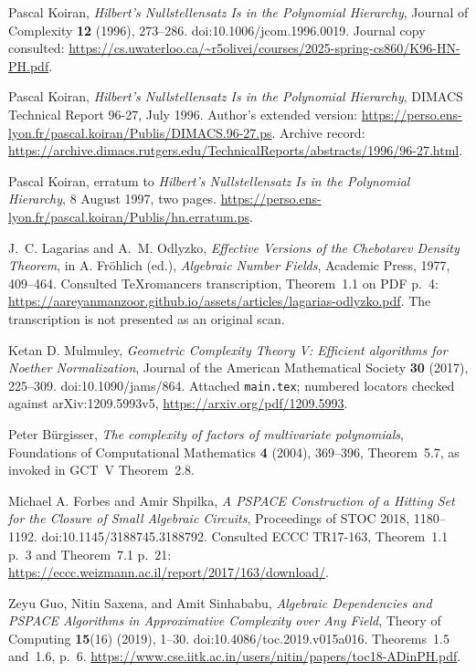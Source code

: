 Pascal Koiran, \emph{Hilbert's Nullstellensatz Is in the Polynomial
Hierarchy}, Journal of Complexity \textbf{12} (1996), 273--286.
doi:10.1006/jcom.1996.0019.
Journal copy consulted:
\url{https://cs.uwaterloo.ca/~r5olivei/courses/2025-spring-cs860/K96-HN-PH.pdf}.

Pascal Koiran, \emph{Hilbert's Nullstellensatz Is in the Polynomial
Hierarchy}, DIMACS Technical Report 96-27, July 1996.
Author's extended version:
\url{https://perso.ens-lyon.fr/pascal.koiran/Publis/DIMACS.96-27.ps}.
Archive record:
\url{https://archive.dimacs.rutgers.edu/TechnicalReports/abstracts/1996/96-27.html}.

Pascal Koiran, erratum to \emph{Hilbert's Nullstellensatz Is in the
Polynomial Hierarchy}, 8 August 1997, two pages.
\url{https://perso.ens-lyon.fr/pascal.koiran/Publis/hn.erratum.ps}.

J.~C. Lagarias and A.~M. Odlyzko, \emph{Effective Versions of the
Chebotarev Density Theorem}, in A. Fr\"ohlich (ed.), \emph{Algebraic
Number Fields}, Academic Press, 1977, 409--464.
Consulted TeXromancers transcription, Theorem~1.1 on PDF p.~4:
\url{https://aareyanmanzoor.github.io/assets/articles/lagarias-odlyzko.pdf}.
The transcription is not presented as an original scan.

Ketan D. Mulmuley, \emph{Geometric Complexity Theory V: Efficient
algorithms for Noether Normalization}, Journal of the American
Mathematical Society \textbf{30} (2017), 225--309.
doi:10.1090/jams/864.
Attached \texttt{main.tex}; numbered locators checked against
arXiv:1209.5993v5, \url{https://arxiv.org/pdf/1209.5993}.

Peter B\"urgisser, \emph{The complexity of factors of multivariate
polynomials}, Foundations of Computational Mathematics \textbf{4}
(2004), 369--396, Theorem~5.7, as invoked in GCT~V Theorem~2.8.

Michael A. Forbes and Amir Shpilka, \emph{A PSPACE Construction of a
Hitting Set for the Closure of Small Algebraic Circuits}, Proceedings
of STOC 2018, 1180--1192. doi:10.1145/3188745.3188792.
Consulted ECCC TR17-163, Theorem~1.1 p.~3 and Theorem~7.1 p.~21:
\url{https://eccc.weizmann.ac.il/report/2017/163/download/}.

Zeyu Guo, Nitin Saxena, and Amit Sinhababu,
\emph{Algebraic Dependencies and PSPACE Algorithms in Approximative
Complexity over Any Field}, Theory of Computing \textbf{15}(16)
(2019), 1--30. doi:10.4086/toc.2019.v015a016.
Theorems~1.5 and~1.6, p.~6.
\url{https://www.cse.iitk.ac.in/users/nitin/papers/toc18-ADinPH.pdf}.

